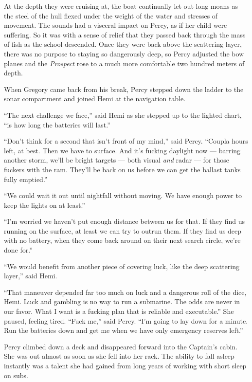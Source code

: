 \documentclass[
]{scrbook}
\begin{document}
At the depth they were cruising at, the boat continually let out long
moans as the steel of the hull flexed under the weight of the water and
stresses of movement. The sounds had a visceral impact on Percy, as if
her child were suffering. So it was with a sense of relief that they
passed back through the mass of fish as the school descended. Once they
were back above the scattering layer, there was no purpose to staying so
dangerously deep, so Percy adjusted the bow planes and the
\emph{Prospect} rose to a much more comfortable two hundred meters of
depth.

When Gregory came back from his break, Percy stepped down the ladder to
the sonar compartment and joined Hemi at the navigation table.

``The next challenge we face,'' said Hemi as she stepped up to the
lighted chart, ``is how long the batteries will last.''

``Don't think for a second that isn't front of my mind,'' said Percy.
``Coupla hours left, at best. Then we have to surface. And it's fucking
daylight now --- barring another storm, we'll be bright targets --- both
visual \emph{and} radar --- for those fuckers with the ram. They'll be
back on us before we can get the ballast tanks fully emptied.''

``We could wait it out until nightfall without moving. We have enough
power to keep the lights on at least.''

``I'm worried we haven't put enough distance between us for that. If
they find us running on the surface, at least we can try to outrun them.
If they find us deep with no battery, when they come back around on
their next search circle, we're done for.''

``We would benefit from another piece of covering luck, like the deep
scattering layer,'' said Hemi.

``That maneuver depended far too much on luck and a dangerous roll of
the dice, Hemi. Luck and gambling is no way to run a submarine. The odds
are never in our favor. What I want is a fucking plan that is reliable
and executable.'' She paused, feeling tired. ``Fuck me,'' said Percy.
``I'm going to lay down for a minute. Run the batteries down and get me
when we have only emergency reserves left.''

Percy climbed down a deck and disappeared forward into the Captain's
cabin. She was out almost as soon as she fell into her rack. The ability
to fall asleep instantly was a talent she had gained from long years of
working with short sleep on subs.
\end{document}
